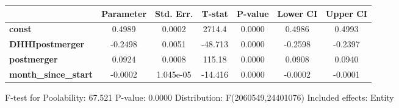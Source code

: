 \documentclass{report}
\begin{document}
\begin{center}
\begin{tabular}{lcccccc}
                             & \textbf{Parameter} & \textbf{Std. Err.} & \textbf{T-stat} & \textbf{P-value} & \textbf{Lower CI} & \textbf{Upper CI}  \\
\midrule
\textbf{const}               &       0.4989       &       0.0002       &      2714.4     &      0.0000      &       0.4986      &       0.4993       \\
\textbf{DHHIpostmerger}      &      -0.2498       &       0.0051       &     -48.713     &      0.0000      &      -0.2598      &      -0.2397       \\
\textbf{postmerger}          &       0.0924       &       0.0008       &      115.18     &      0.0000      &       0.0908      &       0.0940       \\
\textbf{month\_since\_start} &      -0.0002       &     1.045e-05      &     -14.416     &      0.0000      &      -0.0002      &      -0.0001       \\
\bottomrule
\end{tabular}
\end{center}

F-test for Poolability: 67.521 \newline
 P-value: 0.0000 \newline
 Distribution: F(2060549,24401076) \newline
  \newline
 Included effects: Entity
\end{document}
